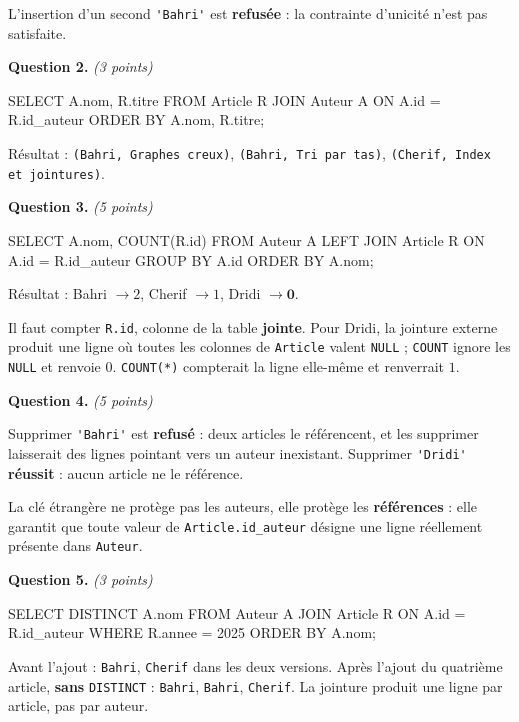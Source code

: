 L'insertion d'un second \lstinline{'Bahri'} est \textbf{refusée} : la
contrainte d'unicité n'est pas satisfaite.

\medskip
\textbf{Question 2.} \emph{(3 points)}

\begin{sql}
SELECT A.nom, R.titre
FROM Article R JOIN Auteur A ON A.id = R.id_auteur
ORDER BY A.nom, R.titre;
\end{sql}

Résultat : \lstinline{(Bahri, Graphes creux)}, \lstinline{(Bahri, Tri par tas)},
\lstinline{(Cherif, Index et jointures)}.

\medskip
\textbf{Question 3.} \emph{(5 points)}

\begin{sql}
SELECT A.nom, COUNT(R.id)
FROM Auteur A LEFT JOIN Article R ON A.id = R.id_auteur
GROUP BY A.id ORDER BY A.nom;
\end{sql}

Résultat : Bahri $\rightarrow 2$, Cherif $\rightarrow 1$, Dridi
$\rightarrow \mathbf{0}$.

Il faut compter \lstinline{R.id}, colonne de la table \textbf{jointe}. Pour
Dridi, la jointure externe produit une ligne où toutes les colonnes de
\lstinline{Article} valent \lstinline{NULL} ; \lstinline{COUNT} ignore les
\lstinline{NULL} et renvoie $0$. \lstinline{COUNT(*)} compterait la ligne
elle-même et renverrait $1$.

\medskip
\textbf{Question 4.} \emph{(5 points)}

Supprimer \lstinline{'Bahri'} est \textbf{refusé} : deux articles le
référencent, et les supprimer laisserait des lignes pointant vers un auteur
inexistant. Supprimer \lstinline{'Dridi'} \textbf{réussit} : aucun article ne
le référence.

La clé étrangère ne protège pas les auteurs, elle protège les
\textbf{références} : elle garantit que toute valeur de
\lstinline{Article.id_auteur} désigne une ligne réellement présente dans
\lstinline{Auteur}.

\medskip
\textbf{Question 5.} \emph{(3 points)}

\begin{sql}
SELECT DISTINCT A.nom
FROM Auteur A JOIN Article R ON A.id = R.id_auteur
WHERE R.annee = 2025 ORDER BY A.nom;
\end{sql}

Avant l'ajout : \lstinline{Bahri}, \lstinline{Cherif} dans les deux versions.
Après l'ajout du quatrième article, \textbf{sans} \lstinline{DISTINCT} :
\lstinline{Bahri}, \lstinline{Bahri}, \lstinline{Cherif}. La jointure produit
une ligne par article, pas par auteur.

